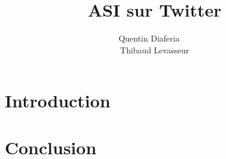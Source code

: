 \documentclass[a4paper,12pt]{article}
\title{ASI sur Twitter}
\author{Quentin Diaferia ~~\\ Thibaud Levasseur}
\begin{document}
\maketitle
\newpage
\tableofcontents
\newpage
\section{Introduction}
\section{Conclusion}
\end{document}
